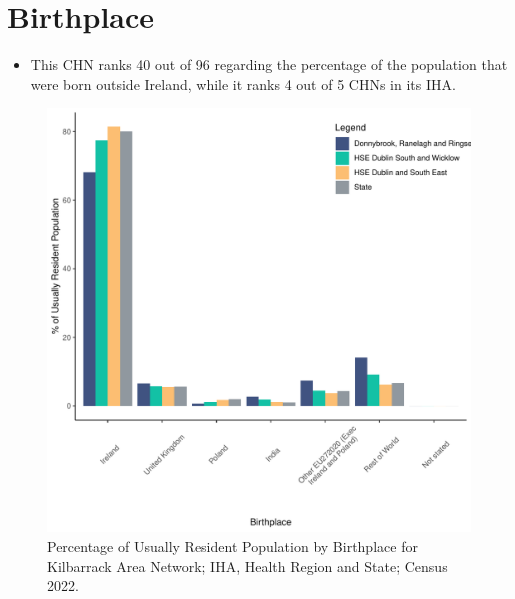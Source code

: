 \documentclass{article}
\begin{document}
\section{Birthplace}\label{sect:Birth}
\begin{itemize}
\item This CHN ranks  40 out of 96 regarding the percentage of the population that were born outside Ireland, while it ranks  4 out of 5 CHNs in its IHA.
\end{itemize}
\begin{figure}[H]
	\centering
	\includegraphics[width = 130mm]{../figures/BirthED.pdf}
	\caption{Percentage of Usually Resident Population by Birthplace for Kilbarrack Area Network; IHA, Health Region and State; Census 2022.}
	\label{fig:vbnv}
	\end{figure}
	
\end{document}
